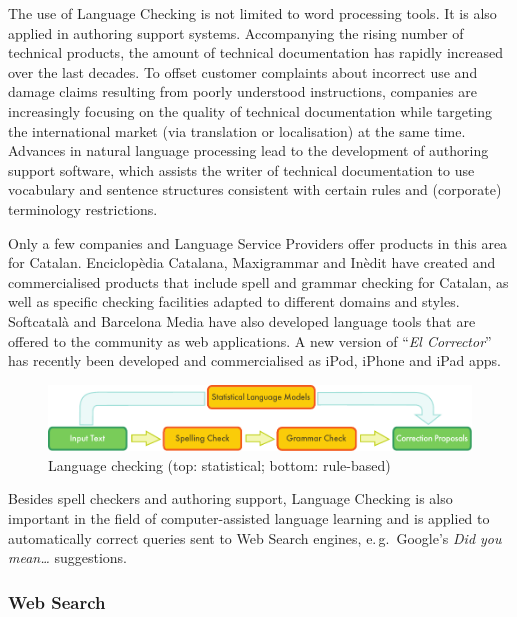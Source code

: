 \begin{multicols}{2}
The use of Language Checking is not limited to word processing tools. It is also applied in authoring support systems. Accompanying the rising number of technical products, the amount of technical documentation has rapidly increased over the last decades. To offset customer complaints about incorrect use and damage claims resulting from poorly understood instructions, companies are increasingly focusing on the quality of technical documentation while targeting the international market (via translation or localisation) at the same time. Advances in natural language processing lead to the development of authoring support software, which assists the writer of technical documentation to use vocabulary and sentence structures consistent with certain rules and (corporate) terminology restrictions.


Only a few companies and Language Service Providers offer products in this area for Catalan. Enciclopèdia Catalana, Maxigrammar and Inèdit have created and commercialised products that include spell and grammar checking for Catalan, as well as specific checking facilities adapted to different domains and styles. Softcatalà and Barcelona Media have also developed language tools that are offered to the community as web applications. A new version of ``\textit{El Corrector}” has recently been developed and commercialised as iPod, iPhone and iPad apps. 


\begin{figure}[htb]
  \center
  \includegraphics[width=\textwidth]{../_media/english/language_checking}
  \caption{Language checking (top: statistical; bottom: rule-based)}
  \label{fig:langcheckingaarch_en}
\end{figure}


Besides spell checkers and authoring support, Language Checking is also important in the field of computer-assisted language learning and is applied to automatically correct queries sent to Web Search engines, e.\,g.~Google’s \textit{Did you mean…} suggestions. 

\subsubsection{Web Search}



\end{multicols}
